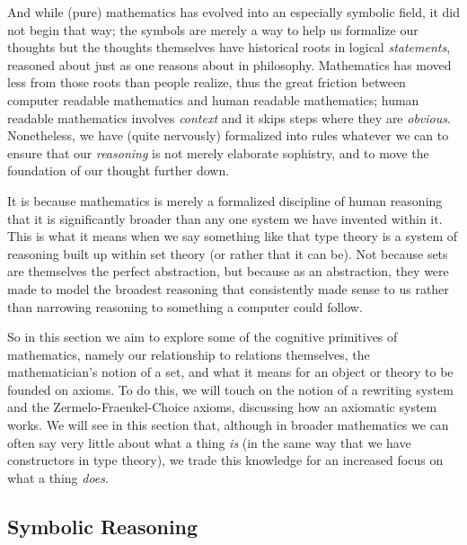 \documentclass[11pt]{article}
\begin{document}
And while (pure) mathematics has evolved into an especially symbolic field, it did not begin that way; the symbols are merely a way to help us formalize our thoughts but the thoughts themselves have historical roots in logical \emph{statements}, reasoned about just as one reasons about in philosophy. Mathematics has moved less from those roots than people realize, thus the great friction between computer readable mathematics and human readable mathematics; human readable mathematics involves \emph{context} and it skips steps where they are \emph{obvious}. Nonetheless, we have (quite nervously) formalized into rules whatever we can to ensure that our \emph{reasoning} is not merely elaborate sophistry, and to move the foundation of our thought further down.

It is because mathematics is merely a formalized discipline of human reasoning that it is significantly broader than any one system we have invented within it. This is what it means when we say something like that type theory is a system of reasoning built up within set theory (or rather that it can be). Not because sets are themselves the perfect abstraction, but because as an abstraction, they were made to model the broadest reasoning that consistently made sense to us rather than narrowing reasoning to something a computer could follow.


So in this section we aim to explore some of the cognitive primitives of mathematics, namely our relationship to relations themselves, the mathematician's notion of a set, and what it means for an object or theory to be founded on axioms. To do this, we will touch on the notion of a rewriting system and the Zermelo-Fraenkel-Choice axioms, discussing how an axiomatic system works. We will see in this section that, although in broader mathematics we can often say very little about what a thing \emph{is} (in the same way that we have constructors in type theory), we trade this knowledge for an increased focus on what a thing \emph{does}.

\subsection{Symbolic Reasoning}
\end{document}
